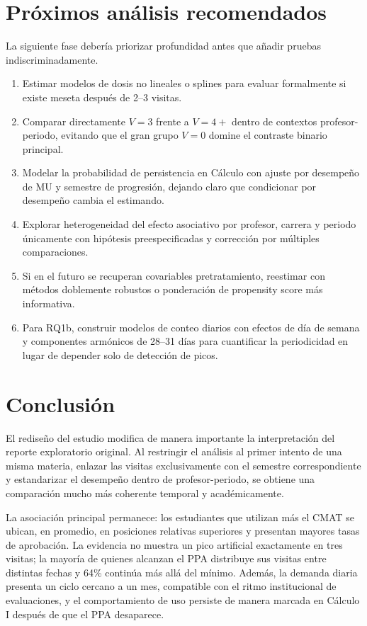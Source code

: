 \documentclass[11pt,letterpaper]{article}
\begin{document}
\section{Próximos análisis recomendados}

La siguiente fase debería priorizar profundidad antes que añadir pruebas indiscriminadamente.

\begin{enumerate}[leftmargin=*]
\item Estimar modelos de dosis no lineales o splines para evaluar formalmente si existe meseta después de 2--3 visitas.
\item Comparar directamente $V=3$ frente a $V=4+$ dentro de contextos profesor-periodo, evitando que el gran grupo $V=0$ domine el contraste binario principal.
\item Modelar la probabilidad de persistencia en Cálculo con ajuste por desempeño de MU y semestre de progresión, dejando claro que condicionar por desempeño cambia el estimando.
\item Explorar heterogeneidad del efecto asociativo por profesor, carrera y periodo únicamente con hipótesis preespecificadas y corrección por múltiples comparaciones.
\item Si en el futuro se recuperan covariables pretratamiento, reestimar con métodos doblemente robustos o ponderación de propensity score más informativa.
\item Para RQ1b, construir modelos de conteo diarios con efectos de día de semana y componentes armónicos de 28--31 días para cuantificar la periodicidad en lugar de depender solo de detección de picos.
\end{enumerate}

\section{Conclusión}

El rediseño del estudio modifica de manera importante la interpretación del reporte exploratorio original. Al restringir el análisis al primer intento de una misma materia, enlazar las visitas exclusivamente con el semestre correspondiente y estandarizar el desempeño dentro de profesor-periodo, se obtiene una comparación mucho más coherente temporal y académicamente.

La asociación principal permanece: los estudiantes que utilizan más el CMAT se ubican, en promedio, en posiciones relativas superiores y presentan mayores tasas de aprobación. La evidencia no muestra un pico artificial exactamente en tres visitas; la mayoría de quienes alcanzan el PPA distribuye sus visitas entre distintas fechas y 64\% continúa más allá del mínimo. Además, la demanda diaria presenta un ciclo cercano a un mes, compatible con el ritmo institucional de evaluaciones, y el comportamiento de uso persiste de manera marcada en Cálculo I después de que el PPA desaparece.
\end{document}
